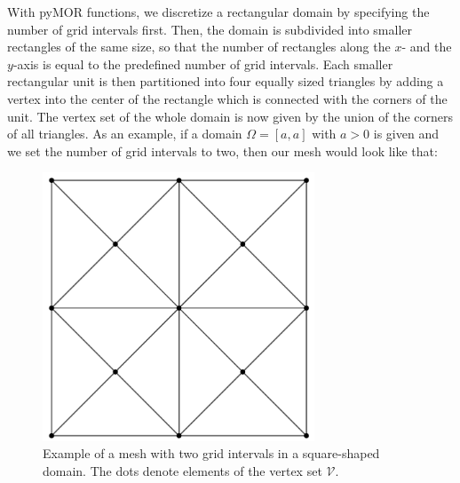 With pyMOR functions, we discretize a rectangular domain by specifying the number of grid intervals first. Then, the domain is subdivided into smaller rectangles of the same size, so that the number of rectangles along the $x$- and the $y$-axis is equal to the predefined number of grid intervals. Each smaller rectangular unit is then partitioned into four equally sized triangles by adding a vertex into the center of the rectangle which is connected with the corners of the unit. The vertex set of the whole domain is now given by the union of the corners of all triangles. As an example, if a domain $\Omega = [a, a]$ with $a>0$ is given and we set the number of grid intervals to two, then our mesh would look like that:
\begin{figure}
    \centering
    \includegraphics[height=8cm]{mesh.png} 
    \caption{Example of a mesh with two grid intervals in a square-shaped domain. The dots denote elements of the vertex set $\mathcal{V}$.}
\end{figure}

